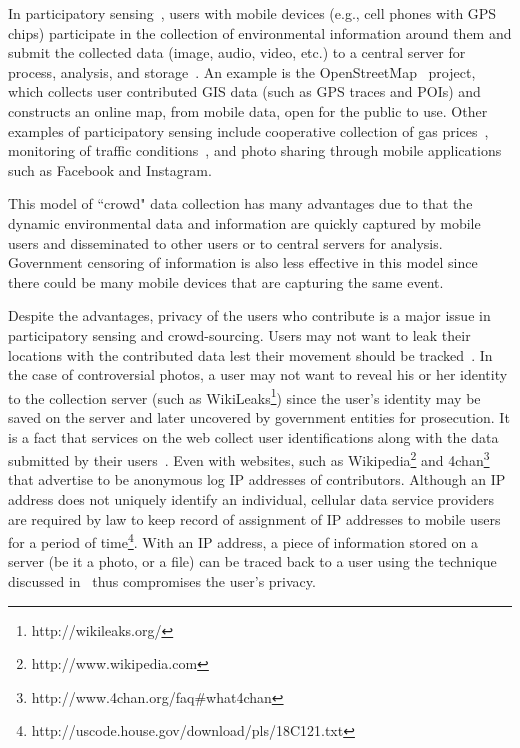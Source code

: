 
In participatory
sensing~\cite{conf/sensys/ReddyBEHS07,conf/sensys/DuttaAKMMWW09},
users with mobile devices (e.g., cell phones with GPS chips)
participate in the collection of environmental information around
them and submit the collected data (image, audio, video, etc.) to
a central server for process, analysis, and
storage~\cite{DBLP:conf/mobisys/MunRSYBEHHWB09}. An example is the
OpenStreetMap~\cite{DBLP:journals/pervasive/HaklayW08} project,
which collects user contributed GIS data (such as GPS traces and
POIs) and constructs an online map, from mobile data, open for the
public to use. Other examples of participatory sensing include
cooperative collection of gas
prices~\cite{DBLP:conf/dcoss/DongKCB08}, monitoring of traffic
conditions~\cite{DBLP:conf/dcoss/ConceicaoFB08}, and photo sharing
through mobile applications such as Facebook and Instagram.

This model of ``crowd" data collection has many advantages due to
that the dynamic environmental data and information are quickly
captured by mobile users and disseminated to other users or to
central servers for analysis. Government censoring of information
is also less effective in this model since there could be many
mobile devices that are capturing the same event.

Despite the advantages, privacy of the users who contribute is a
major issue in participatory sensing and crowd-sourcing. Users may
not want to leak their locations with the contributed data lest
their movement should be
tracked~\cite{conf/icde/YiuJHL08,journals/pvldb/WangL09}. In the
case of controversial photos, a user may not want to reveal his or
her identity to the collection server (such as
WikiLeaks\footnote{http://wikileaks.org/}) since the user's
identity may be saved on the server and later uncovered by
government entities for prosecution. It is a fact that services on
the web collect user identifications along with the data submitted
by their users~\cite{wiki_privacy}. Even with websites, such as
Wikipedia\footnote{http://www.wikipedia.com} and
4chan\footnote{http://www.4chan.org/faq\#what4chan} that advertise
to be anonymous log IP addresses of contributors. Although an IP
address does not uniquely identify an individual, cellular data
service providers are required by law to keep record of assignment
of IP addresses to mobile users for a period of
time\footnote{http://uscode.house.gov/download/pls/18C121.txt}.
With an IP address, a piece of information stored on a server (be
it a photo, or a file) can be traced back to a user using the
technique discussed in~\cite{DBLP:journals/ijufks/Sweene02} thus
compromises the user's privacy.


